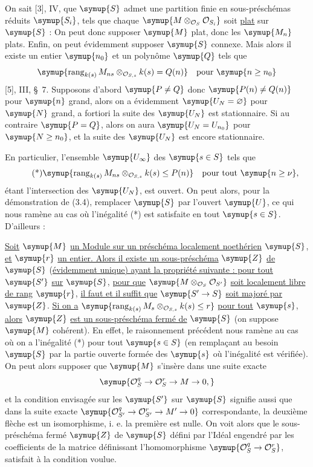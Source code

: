 On sait [3], IV, que $\symup{S}$ admet une partition finie en sous-préschémas réduits
$\symup{S_i}$, tels que chaque $\symup{M\otimes_{\mathcal O_S}\mathcal O_{S_i}}$ soit \uline{plat} sur
$\symup{S}$ : On peut donc supposer $\symup{M}$ plat, donc les $\symup{M_n}$ plats. Enfin, on peut
évidemment supposer $\symup{S}$ connexe. Mais alors il existe un entier $\symup{n_0}$ et un
polynôme $\symup{Q}$ tels que
\[
\symup{\operatorname{rang}_{k(s)}
M_{ns}\otimes_{\mathcal O_{S,s}}k(s)=Q(n)}
\quad\text{pour $\symup{n\geq n_0}$}
\]
[5], III, \S~7. Supposons d'abord $\symup{P\neq Q}$ donc
$\symup{P(n)\neq Q(n)}$ pour $\symup{n}$ grand, alors on a évidemment $\symup{U_N=\varnothing}$ pour $\symup{N}$
grand, a fortiori la suite des $\symup{U_N}$ est stationnaire. Si au contraire $\symup{P=Q}$, alors on aura $\symup{U_N=U_{n_0}}$ pour $\symup{N\geq n_0}$,
et la suite des $\symup{U_N}$ est encore stationnaire.

En particulier, l'ensemble $\symup{U_\infty}$ des $\symup{s\in S}$ tels que
\[
\tag{*}
\symup{\operatorname{rang}_{k(s)}
M_{ns}\otimes_{\mathcal O_{S,s}}k(s)\leq P(n)}
\quad\text{pour tout $\symup{n\geq\nu}$},
\]
étant l'intersection des $\symup{U_N}$, est ouvert. On peut alors, pour la démonstration
de (3.4), remplacer $\symup{S}$ par l'ouvert $\symup{U}$, ce qui nous ramène au cas où
l'inégalité (*) est satisfaite en tout $\symup{s\in S}$. D'ailleurs :

 \uline{Soit} $\symup{M}$ \uline{un Module sur un préschéma localement noethérien}
$\symup{S}$, \uline{et} $\symup{r}$ \uline{un entier. Alors il existe un sous-préschéma} $\symup{Z}$ \uline{de} $\symup{S}$
(\uline{évidemment unique) ayant la propriété suivante : pour tout} $\symup{S'}$ \uline{sur} $\symup{S}$, \uline{pour
que} $\symup{M\otimes_{\mathcal O_S}\mathcal O_{S'}}$ \uline{soit localement libre de rang} $\symup{r}$,
\uline{il faut et il suffit que} $\symup{S'\to S}$ \uline{soit majoré par} $\symup{Z}$. \uline{Si on a}
$\symup{\operatorname{rang}_{k(s)}M_s\otimes_{\mathcal O_{S,s}}k(s)\leq r}$
\uline{pour tout} $\symup{s}$, \uline{alors} $\symup{Z}$ \uline{est un sous-préschéma fermé de} $\symup{S}$ (on suppose $\symup{M}$ cohérent).
En effet, le raisonnement précédent nous ramène au cas où on a l'inégalité (*)
pour tout $\symup{s\in S}$ (en remplaçant au besoin $\symup{S}$ par la partie ouverte formée
des $\symup{s}$ où l'inégalité est vérifiée). On peut alors supposer que $\symup{M}$ s'insère
dans une suite exacte
\[
\symup{\mathcal O_S^q\to\mathcal O_S^r\to M\to0,}
\]
et la condition envisagée sur les $\symup{S'}$ sur $\symup{S}$ signifie aussi que dans la suite
exacte $\symup{\mathcal O_{S'}^q\to\mathcal O_{S'}^r
\to M'\to0}$ correspondante, la deuxième flèche est un
isomorphisme, i. e. la première est nulle. On voit alors que le sous-préschéma
fermé $\symup{Z}$ de $\symup{S}$ défini par l'Idéal engendré par les coefficients de la matrice
définissant l'homomorphisme
$\symup{\mathcal O_S^q\to\mathcal O_S^r}$, satisfait à la condition voulue.

